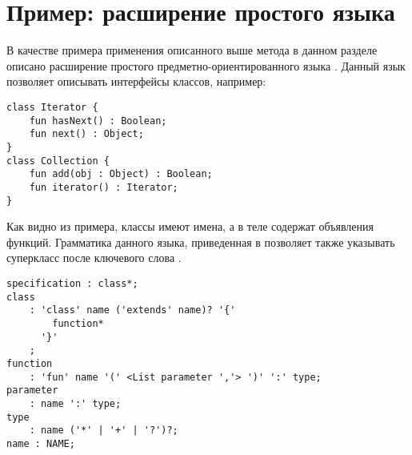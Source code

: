 \chapter{Пример: расширение простого языка}

В качестве примера применения описанного выше метода в данном разделе описано расширение простого предметно-ориентированного языка . Данный язык позволяет описывать интерфейсы классов, например:
\begin{lstlisting}
class Iterator {
	fun hasNext() : Boolean;
	fun next() : Object;
}
class Collection {
	fun add(obj : Object) : Boolean;
	fun iterator() : Iterator;
}
\end{lstlisting}
Как видно из примера, классы имеют имена, а в теле содержат объявления функций. Грамматика данного языка, приведенная в  позволяет также указывать суперкласс после ключевого слова .

\begin{lstlisting}[float=htbp,label=ToyGrammar,caption=Грамматика языка \tool{Toy}]
specification : class*;
class
	: 'class' name ('extends' name)? '{'
		function*
	  '}'
	;
function
	: 'fun' name '(' <List parameter ','> ')' ':' type;
parameter 
	: name ':' type;
type 
	: name ('*' | '+' | '?')?;
name : NAME;
\end{lstlisting}

